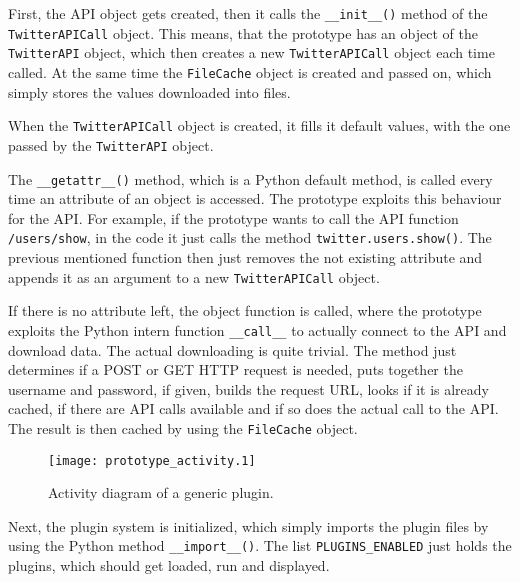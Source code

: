 \lstset{language=python}

First, the API object gets created, then it calls the \texttt{\_\_init\_\_()}
method of the \texttt{TwitterAPICall} object. This means, that the prototype
has an object of the \texttt{TwitterAPI} object, which then creates a new
\texttt{TwitterAPICall} object each time called. At the same time the
\texttt{FileCache} object is created and passed on, which simply stores the
values downloaded into files.

When the \texttt{TwitterAPICall} object is created, it fills it default values,
with the one passed by the \texttt{TwitterAPI} object.

The \texttt{\_\_getattr\_\_()} method, which is a Python default method, is
called every time an attribute of an object is accessed. The prototype exploits
this behaviour for the \Twitter{} API. For example, if the prototype wants to
call the API function \texttt{/users/show}, in the code it just calls the
method \texttt{twitter.users.show()}. The previous mentioned function then just
removes the not existing attribute and appends it as an argument to a new
\texttt{TwitterAPICall} object.

If there is no attribute left, the object function is called, where the
prototype exploits the Python intern function \texttt{\_\_call\_\_} to actually
connect to the \Twitter{} API and download data. The actual downloading is
quite trivial. The method just determines if a POST or GET HTTP request
is needed, puts together the username and password, if given, builds the
request URL, looks if it is already cached, if there are API calls available
and if so does the actual call to the \Twitter{} API. The result is then cached
by using the \texttt{FileCache} object.

\begin{figure}[htb]
  \begin{center}
    \texttt{[image: prototype\_activity.1]}
    \caption{Activity diagram of a generic plugin.}
    \label{fig:prototype_activity}
  \end{center}
\end{figure}

Next, the plugin system is initialized, which simply imports the plugin files
by using the Python method \texttt{\_\_import\_\_()}. The list
\texttt{PLUGINS\_ENABLED} just holds the plugins, which should get loaded, run
and displayed.

